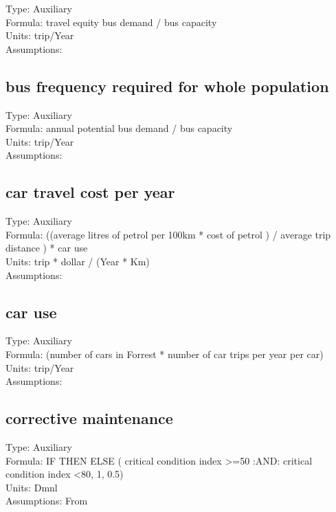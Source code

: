 \documentclass[
  11pt,
]{book}
\begin{document}
Type: Auxiliary\\
Formula: travel equity bus demand / bus capacity\\
Units: trip/Year\\
Assumptions:

\hypertarget{bus-frequency-required-for-whole-population}{%
\subsection{bus frequency required for whole population}\label{bus-frequency-required-for-whole-population}}

Type: Auxiliary\\
Formula: annual potential bus demand / bus capacity\\
Units: trip/Year\\
Assumptions:

\hypertarget{car-travel-cost-per-year}{%
\subsection{car travel cost per year}\label{car-travel-cost-per-year}}

Type: Auxiliary\\
Formula: ((average litres of petrol per 100km * cost of petrol ) / average trip distance ) * car use\\
Units: trip * dollar / (Year * Km)\\
Assumptions:

\hypertarget{car-use}{%
\subsection{car use}\label{car-use}}

Type: Auxiliary\\
Formula: (number of cars in Forrest * number of car trips per year per car)\\
Units: trip/Year\\
Assumptions:

\hypertarget{corrective-maintenance}{%
\subsection{corrective maintenance}\label{corrective-maintenance}}

Type: Auxiliary\\
Formula: IF THEN ELSE ( critical condition index \textgreater=50 :AND: critical condition index \textless80, 1, 0.5)\\
Units: Dmnl\\
Assumptions: From \citet{fallah-fini_measuring_2015}
\end{document}
